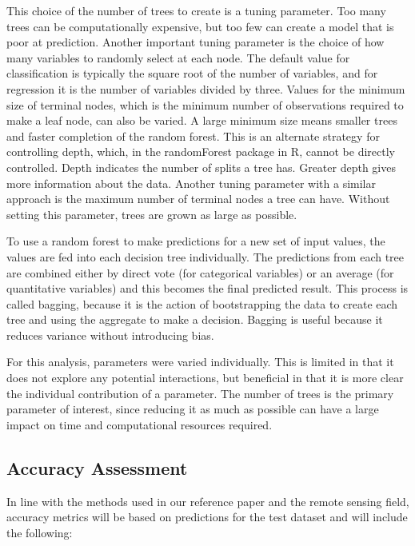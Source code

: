 \documentclass[
]{article}
\begin{document}
This choice of the number of trees to create is a tuning parameter. Too
many trees can be computationally expensive, but too few can create a
model that is poor at prediction. Another important tuning parameter is
the choice of how many variables to randomly select at each node. The
default value for classification is typically the square root of the
number of variables, and for regression it is the number of variables
divided by three. Values for the minimum size of terminal nodes, which
is the minimum number of observations required to make a leaf node, can
also be varied. A large minimum size means smaller trees and faster
completion of the random forest. This is an alternate strategy for
controlling depth, which, in the randomForest package in R, cannot be
directly controlled. Depth indicates the number of splits a tree has.
Greater depth gives more information about the data. Another tuning
parameter with a similar approach is the maximum number of terminal
nodes a tree can have. Without setting this parameter, trees are grown
as large as possible.

To use a random forest to make predictions for a new set of input
values, the values are fed into each decision tree individually. The
predictions from each tree are combined either by direct vote (for
categorical variables) or an average (for quantitative variables) and
this becomes the final predicted result. This process is called bagging,
because it is the action of bootstrapping the data to create each tree
and using the aggregate to make a decision. Bagging is useful because it
reduces variance without introducing bias.

For this analysis, parameters were varied individually. This is limited
in that it does not explore any potential interactions, but beneficial
in that it is more clear the individual contribution of a parameter. The
number of trees is the primary parameter of interest, since reducing it
as much as possible can have a large impact on time and computational
resources required.

\hypertarget{accuracy-assessment}{%
\subsection{Accuracy Assessment}\label{accuracy-assessment}}

In line with the methods used in our reference paper and the remote
sensing field, accuracy metrics will be based on predictions for the
test dataset and will include the following:
\end{document}
